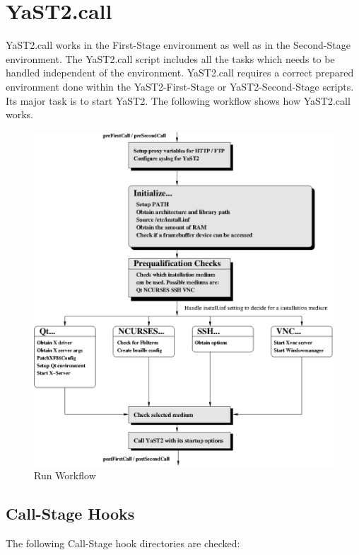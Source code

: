 \chapter{YaST2.call}

YaST2.call works in the First-Stage environment as well as in the
Second-Stage environment. The YaST2.call script includes all the tasks
which needs to be handled independent of the environment. YaST2.call
requires a correct prepared environment done within the YaST2-First-Stage
or YaST2-Second-Stage scripts. Its major task is to start YaST2.
The following workflow shows how YaST2.call works.

\begin{figure}[h]
\caption{Run Workflow}
\includegraphics[scale=1]{pictures/run.eps}
\end{figure}

\section{Call-Stage Hooks}
The following Call-Stage hook directories are checked:

